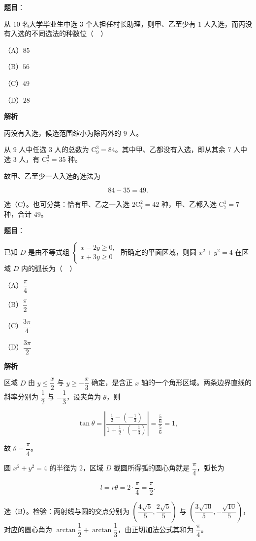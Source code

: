 \begin{answer}

\textbf{题目}：

从 $10$ 名大学毕业生中选 $3$ 个人担任村长助理，则甲、乙至少有 $1$ 人入选，而丙没有入选的不同选法的种数位（　）

（A）$85$

（B）$56$

（C）$49$

（D）$28$

\textbf{解析}

丙没有入选，候选范围缩小为除丙外的 $9$ 人。

从 $9$ 人中任选 $3$ 人的总数为 $\mathrm C_9^3=84$。其中甲、乙都没有入选，即从其余 $7$ 人中选 $3$ 人，有 $\mathrm C_7^3=35$ 种。

故甲、乙至少一人入选的选法为

\nopagebreak[4]
\[84-35=49.\]

选（C）。也可分类：恰有甲、乙之一入选 $2\mathrm C_7^2=42$ 种，甲、乙都入选 $\mathrm C_7^1=7$ 种，合计 $49$。


\end{answer}
\begin{answer}

\textbf{题目}：

已知 $D$ 是由不等式组 $\begin{cases}x-2y\geqslant0,\\ x+3y\geqslant0\end{cases}$ 所确定的平面区域，则圆 $x^2+y^2=4$ 在区域 $D$ 内的弧长为（　）

（A）$\dfrac\pi4$

（B）$\dfrac\pi2$

（C）$\dfrac{3\pi}4$

（D）$\dfrac{3\pi}2$

\textbf{解析}

区域 $D$ 由 $y\leqslant\dfrac x2$ 与 $y\geqslant-\dfrac x3$ 确定，是含正 $x$ 轴的一个角形区域。两条边界直线的斜率分别为 $\dfrac12$ 与 $-\dfrac13$，设夹角为 $\theta$，则

\nopagebreak[4]
\[\tan\theta=\left|\frac{\frac12-\left(-\frac13\right)}{1+\frac12\cdot\left(-\frac13\right)}\right|
=\frac{\frac56}{\frac56}=1,\]

故 $\theta=\dfrac\pi4$。

圆 $x^2+y^2=4$ 的半径为 $2$，区域 $D$ 截圆所得弧的圆心角就是 $\dfrac\pi4$，弧长为

\nopagebreak[4]
\[l=r\theta=2\cdot\frac\pi4=\frac\pi2.\]

选（B）。检验：两射线与圆的交点分别为 $\left(\dfrac{4\sqrt5}5,\dfrac{2\sqrt5}5\right)$ 与 $\left(\dfrac{3\sqrt{10}}5,-\dfrac{\sqrt{10}}5\right)$，对应的圆心角为 $\arctan\dfrac12+\arctan\dfrac13$，由正切加法公式其和为 $\dfrac\pi4$。


\end{answer}
